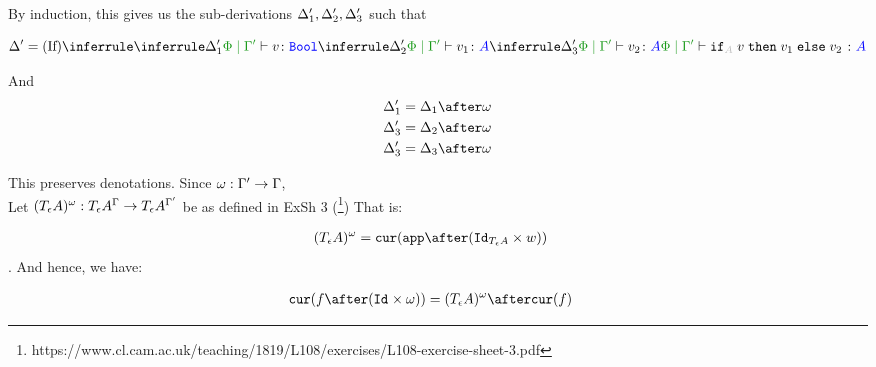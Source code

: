 {    By induction, this gives us the sub-derivations $\Delta_1', \Delta_2', \Delta_3'$ such that

    \begin{equation}
        \D' = \ntreeruleIII{If}{
            \treeruleI{\D_1'}{\etyperelation{\P}{\G'}{v}{\B}}
            }{
            \treeruleI{\D_2'}{\etyperelation{\P}{\G'}{v_1}{A}}
            }{
            \treeruleI{\D_3'}{\etyperelation{\P}{\G'}{v_2}{A}}
        }{
            \etyperelation{\P}{\G'}{\pifthenelse{A}{v}{v_1}{v_2}}{A}
        }
    \end{equation}

    And 
    \begin{align}
        \D_1' & =\D_1 \after \w\\
        \D_3' & =\D_2 \after \w\\
        \D_3' & =\D_3 \after \w 
    \end{align}


    This preserves denotations.
    Since $\omega: \Gamma' \rightarrow \Gamma$, \\
    Let $(T_{\epsilon}{A})^{\omega}: T_{\epsilon}{A}^{\Gamma}\rightarrow T_{\epsilon}{A}^{\Gamma'}$ be as defined in ExSh 3 (\footnote{https://www.cl.cam.ac.uk/teaching/1819/L108/exercises/L108-exercise-sheet-3.pdf})
    That is:

    \begin{align}
        (\tea)^{\w} & = \cur{\app\after(\Id{\tea}\times w)}
    \end{align}.
    And hence, we have:

    \begin{align}
        \cur{f\after(\Id{}\times \w)} & = (\tea)^{\w} \after\cur{f}
    \end{align}

}
